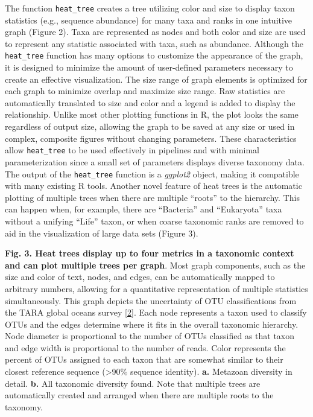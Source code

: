 \documentclass[10pt,letterpaper]{article}
\begin{document}
The function \texttt{heat\_tree} creates a tree utilizing color and size
to display taxon statistics (e.g., sequence abundance) for many taxa and
ranks in one intuitive graph (Figure 2). Taxa are represented as nodes
and both color and size are used to represent any statistic associated
with taxa, such as abundance. Although the \texttt{heat\_tree} function
has many options to customize the appearance of the graph, it is
designed to minimize the amount of user-defined parameters necessary to
create an effective visualization. The size range of graph elements is
optimized for each graph to minimize overlap and maximize size range.
Raw statistics are automatically translated to size and color and a
legend is added to display the relationship. Unlike most other plotting
functions in R, the plot looks the same regardless of output size,
allowing the graph to be saved at any size or used in complex, composite
figures without changing parameters. These characteristics allow
\texttt{heat\_tree} to be used effectively in pipelines and with minimal
parameterization since a small set of parameters displays diverse
taxonomy data. The output of the \texttt{heat\_tree} function is a
\emph{ggplot2} object, making it compatible with many existing R tools.
Another novel feature of heat trees is the automatic plotting of
multiple trees when there are multiple ``roots'' to the hierarchy. This
can happen when, for example, there are ``Bacteria'' and ``Eukaryota''
taxa without a unifying ``Life'' taxon, or when coarse taxonomic ranks
are removed to aid in the visualization of large data sets (Figure 3).

\textbf{Fig. 3. Heat trees display up to four metrics in a taxonomic
context and can plot multiple trees per graph}. Most graph components,
such as the size and color of text, nodes, and edges, can be
automatically mapped to arbitrary numbers, allowing for a quantitative
representation of multiple statistics simultaneously. This graph depicts
the uncertainty of OTU classifications from the TARA global oceans
survey \hyperref[csl:2]{[2]}. Each node represents a taxon used to
classify OTUs and the edges determine where it fits in the overall
taxonomic hierarchy. Node diameter is proportional to the number of OTUs
classified as that taxon and edge width is proportional to the number of
reads. Color represents the percent of OTUs assigned to each taxon that
are somewhat similar to their closest reference sequence
(\textgreater{}90\% sequence identity). \textbf{a.} Metazoan diversity
in detail. \textbf{b.} All taxonomic diversity found. Note that multiple
trees are automatically created and arranged when there are multiple
roots to the taxonomy.
\end{document}
